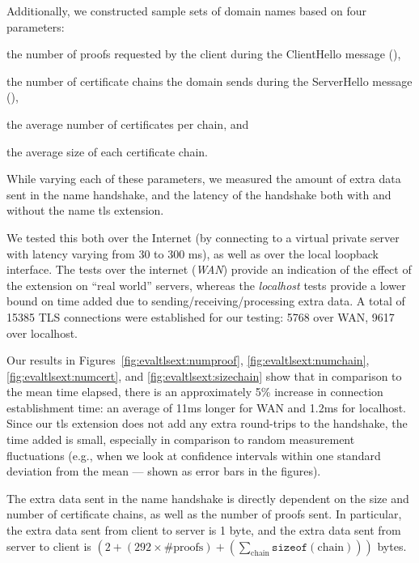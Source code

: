 Additionally, we constructed sample sets of domain names based on four parameters:
\begin{inparaenum}
\item the number of proofs requested by the client during the
  ClientHello message (\numlas),
\item the number of certificate chains the domain sends during the ServerHello
  message (\policy),
\item the average number of certificates per chain, and
\item the average size of each certificate chain.
\end{inparaenum}
While varying each of these parameters, we measured the amount of extra data
sent in the \ac{name} handshake, and the latency of the handshake both with and
without the \ac{name} \ac{tls} extension.

We tested this both over the Internet (by connecting to a virtual private server
with latency varying from 30 to 300 ms), as well
as over the local loopback interface. The
tests over the internet (\emph{WAN}) provide an indication of the effect of
the extension on ``real world'' servers, 
whereas the \emph{localhost} tests provide a lower bound on time added due to
sending/receiving/processing extra data. A total of 15385 TLS connections were
established for our testing: 5768 over WAN, 9617 over localhost.

Our results in Figures~\ref{fig:evaltlsext:numproof},
\ref{fig:evaltlsext:numchain}, \ref{fig:evaltlsext:numcert}, and
\ref{fig:evaltlsext:sizechain} show that in comparison to the mean time
elapsed, there is an approximately 5\% increase in connection establishment
time: an average of 11ms longer for WAN and 1.2ms for localhost. 
Since our \ac{tls} extension does not add any extra round-trips to the
handshake, the time added is small, especially in comparison to random
measurement fluctuations (e.g., when we look at confidence intervals within one
standard deviation from the mean --- shown as error bars in the figures).

The extra data sent in the \ac{name} handshake is directly dependent on the size
and number of certificate chains, as well as the number of proofs sent. In
particular, the extra data sent from client to server is 1 byte, and the extra
data sent from server to client is
$(2 + (292 \times \text{\#proofs}) +
(\sum_{\text{chain}}\texttt{sizeof}(\text{chain})))$ bytes. 
